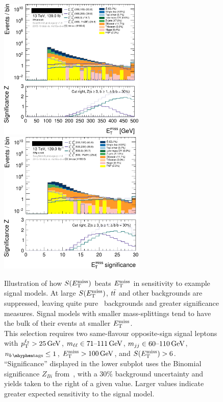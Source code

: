 \begin{figure}[tp]
\centering
\includegraphics[width=0.62\textwidth]{figures/2ljets_presel_met_logy.png}
\\
\includegraphics[width=0.62\textwidth]{figures/2ljets_presel_met_sig_logy.png}
\caption[
Illustration of how $\metsig$ beats $\met$ in sensitivity to example signal
models
]{
Illustration of how $\metsig$ beats $\met$ in sensitivity to example signal
models.
At large $\metsig$, $\ttbar$ and other backgrounds are suppressed, leaving
quite pure \diboson\ backgrounds and greater significance measures.
Signal models with smaller mass-splittings tend to have the bulk of their
events at smaller $\met$.
\\
This selection requires two same-flavour opposite-sign signal leptons with
$\pt^{\ell_2} > 25\,\eV[G]$,
$\mll \in 71\textrm{--}111\,\eV[G]$,
$\mjj \in 60\textrm{--}110\,\eV[G]$,
$\nbtag \leq 1$,
$\met > 100\,\eV[G]$, and
$\metsig > 6$.
\\
``Significance'' displayed in the lower subplot uses the Binomial significance
$Z_{Bi}$ from~\cite{cousins2008evaluation}, with a $30\%$ background
uncertainty and yields taken to the right of a given value.
Larger values indicate greater expected sensitivity to the signal model.
}
\label{fig:2ljets_presel_met}
\end{figure}

